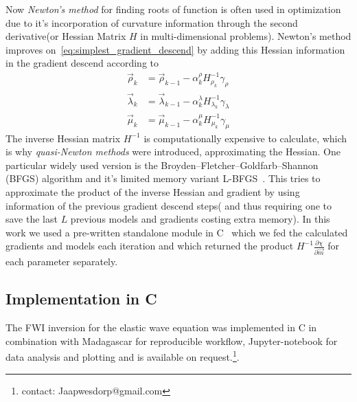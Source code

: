 \documentclass[10pt]{SelfArx} %
\newcommand{\pder}[2][]{\frac{\partial#1}{\partial#2}}
\theoremstyle{definition}
\begin{document}
Now \emph{Newton's method} for finding roots of function is often used in optimization due to it's incorporation of curvature information through the second derivative(or Hessian Matrix $H$ in multi-dimensional problems). Newton's method improves on~\cref{eq:simplest_gradient_descend} by adding this Hessian information in the gradient descend according to
\begin{equation}\label{eq:newtons_method_grad_descend}
\begin{aligned}
\vec{\rho}_k &= \vec{\rho}_{k-1} - \alpha^{\rho}_k H_{\rho_k}^{-1} \gamma_\rho \\
\vec{\lambda}_k &= \vec{\lambda}_{k-1} - \alpha^{\lambda}_k H_{\lambda_k}^{-1} \gamma_\lambda \\
\vec{\mu}_k &= \vec{\mu}_{k-1} - \alpha^{\mu}_k H_{\mu_k}^{-1} \gamma_\mu
\end{aligned}
\end{equation}
The inverse Hessian matrix $H^{-1}$ is computationally expensive to calculate, which is why \emph{quasi-Newton methods} were introduced, approximating the Hessian. One particular widely used version is the Broyden–Fletcher–Goldfarb–Shannon (BFGS) algorithm and it's limited memory variant L-BFGS~\cite{Liu1989}. This tries to approximate the product of the inverse Hessian and gradient by using information of the previous gradient descend steps( and thus requiring one to save the last $L$ previous models and gradients costing extra memory). In this work we used a pre-written standalone module in C~\cite{Alberto2018} which we fed the calculated gradients and models each iteration and which returned the product $H^{-1}\pder[\chi]{\vec{m}}$ for each parameter separately.

\subsection{Implementation in C}
The FWI inversion for the elastic wave equation was implemented in C in combination with Madagascar\cite{m8r} for reproducible workflow, Jupyter-notebook\cite{Kluyver2016} for data analysis and plotting and is available on request.\footnote{contact: Jaapwesdorp@gmail.com}. 
\end{document}
